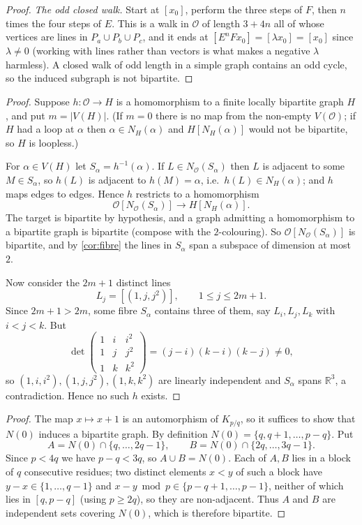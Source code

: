 \documentclass[11pt,a4paper]{article}
\theoremstyle{plain}
\theoremstyle{definition}
\theoremstyle{remark}
\newcommand{\cO}{\mathcal O}
\newcommand{\R}{\mathbb R}
\newcommand{\Kc}[2]{K_{#1/#2}}
\newcommand{\Nb}{N_{\cO}}
\newcommand{\Pl}[1]{P_{#1}}
\begin{document}
\begin{proof}
\emph{The odd closed walk.} Start at $[x_0]$, perform the three steps of $F$, then $n$ times the four steps of $E$. This is a walk in $\cO$ of length $3+4n$ all of whose vertices are lines in $\Pl a\cup\Pl b\cup\Pl c$, and it ends at $[E^nFx_0]=[\lambda x_0]=[x_0]$ since $\lambda\ne0$ (working with lines rather than vectors is what makes a negative $\lambda$ harmless). A closed walk of odd length in a simple graph contains an odd cycle, so the induced subgraph is not bipartite.
\end{proof}

\label{pf:main}
\thmmain*
\begin{proof}
Suppose $h\colon\cO\to H$ is a homomorphism to a finite locally bipartite graph $H$, and put $m=|V(H)|$. (If $m=0$ there is no map from the non-empty $V(\cO)$; if $H$ had a loop at $\alpha$ then $\alpha\in N_H(\alpha)$ and $H[N_H(\alpha)]$ would not be bipartite, so $H$ is loopless.)

For $\alpha\in V(H)$ let $S_\alpha=h^{-1}(\alpha)$. If $L\in\Nb(S_\alpha)$ then $L$ is adjacent to some $M\in S_\alpha$, so $h(L)$ is adjacent to $h(M)=\alpha$, i.e.\ $h(L)\in N_H(\alpha)$; and $h$ maps edges to edges. Hence $h$ restricts to a homomorphism
\[
\cO[\Nb(S_\alpha)]\longrightarrow H[N_H(\alpha)] .
\]
The target is bipartite by hypothesis, and a graph admitting a homomorphism to a bipartite graph is bipartite (compose with the $2$-colouring). So $\cO[\Nb(S_\alpha)]$ is bipartite, and by \cref{cor:fibre} the lines in $S_\alpha$ span a subspace of dimension at most $2$.

Now consider the $2m+1$ distinct lines
\[
L_j=[(1,j,j^2)],\qquad 1\le j\le 2m+1 .
\]
Since $2m+1>2m$, some fibre $S_\alpha$ contains three of them, say $L_i,L_j,L_k$ with $i<j<k$. But
\[
\det\begin{pmatrix}1&i&i^2\\1&j&j^2\\1&k&k^2\end{pmatrix}=(j-i)(k-i)(k-j)\ne0,
\]
so $(1,i,i^2),(1,j,j^2),(1,k,k^2)$ are linearly independent and $S_\alpha$ spans $\R^3$, a contradiction. Hence no such $h$ exists.
\end{proof}

\label{pf:locbip}
\lemlocbip*
\begin{proof}
The map $x\mapsto x+1$ is an automorphism of $\Kc pq$, so it suffices to show that $N(0)$ induces a bipartite graph. By definition $N(0)=\{q,q+1,\dots,p-q\}$. Put
\[
A=N(0)\cap\{q,\dots,2q-1\},\qquad B=N(0)\cap\{2q,\dots,3q-1\}.
\]
Since $p<4q$ we have $p-q<3q$, so $A\cup B=N(0)$. Each of $A,B$ lies in a block of $q$ consecutive residues; two distinct elements $x<y$ of such a block have $y-x\in\{1,\dots,q-1\}$ and $x-y\bmod p\in\{p-q+1,\dots,p-1\}$, neither of which lies in $[q,p-q]$ (using $p\ge2q$), so they are non-adjacent. Thus $A$ and $B$ are independent sets covering $N(0)$, which is therefore bipartite.
\end{proof}
\end{document}

